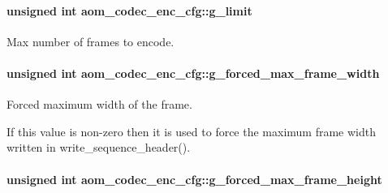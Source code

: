 \paragraph[{\texorpdfstring{g\+\_\+limit}{g_limit}}]{\setlength{\rightskip}{0pt plus 5cm}unsigned int aom\+\_\+codec\+\_\+enc\+\_\+cfg\+::g\+\_\+limit}\hypertarget{structaom__codec__enc__cfg_a71628d182062afe21a884fa584714b74}{}\label{structaom__codec__enc__cfg_a71628d182062afe21a884fa584714b74}


Max number of frames to encode. 

\paragraph[{\texorpdfstring{g\+\_\+forced\+\_\+max\+\_\+frame\+\_\+width}{g_forced_max_frame_width}}]{\setlength{\rightskip}{0pt plus 5cm}unsigned int aom\+\_\+codec\+\_\+enc\+\_\+cfg\+::g\+\_\+forced\+\_\+max\+\_\+frame\+\_\+width}\hypertarget{structaom__codec__enc__cfg_a8349dcee2119c7fb3fd15a0ae6fdcf12}{}\label{structaom__codec__enc__cfg_a8349dcee2119c7fb3fd15a0ae6fdcf12}


Forced maximum width of the frame. 

If this value is non-\/zero then it is used to force the maximum frame width written in write\+\_\+sequence\+\_\+header(). 
\paragraph[{\texorpdfstring{g\+\_\+forced\+\_\+max\+\_\+frame\+\_\+height}{g_forced_max_frame_height}}]{\setlength{\rightskip}{0pt plus 5cm}unsigned int aom\+\_\+codec\+\_\+enc\+\_\+cfg\+::g\+\_\+forced\+\_\+max\+\_\+frame\+\_\+height}\hypertarget{structaom__codec__enc__cfg_a0a02763f4709e7ed87dfa84532d7eaaf}{}\label{structaom__codec__enc__cfg_a0a02763f4709e7ed87dfa84532d7eaaf}


